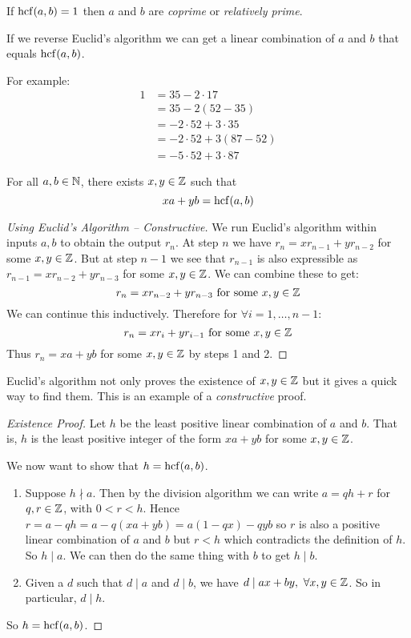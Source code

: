 \documentclass[../main.tex]{subfiles}
\begin{document}
\begin{definition}[Coprime]
  If $\operatorname{hcf}(a, b) = 1$ then $a$ and $b$ are \textit{coprime} or \textit{relatively prime}.
\end{definition}
If we reverse Euclid's algorithm we can get a linear combination of $a$ and $b$ that equals $\operatorname{hcf}(a, b)$.
\begin{example}
  For example:
  \begin{align*}
    1 &= 35 - 2 \cdot 17 \\
      &= 35 - 2(52 - 35) \\
      &= -2 \cdot 52 + 3 \cdot 35 \\
      &= -2 \cdot 52 + 3(87 - 52) \\
      &= -5 \cdot 52 + 3 \cdot 87
  \end{align*}
\end{example}
\begin{theorem}
  For all $a, b \in \mathbb{N}$, there exists $x, y \in \mathbb{Z}$ such that
  \[
    xa + yb = \operatorname{hcf}(a, b)
    \label{bezoutsIdentity}
  \]
\end{theorem}
\begin{proof}[Using Euclid's Algorithm -- Constructive]
  We run Euclid's algorithm within inputs $a, b$ to obtain the output $r_n$.
  At step $n$ we have $r_n = xr_{n-1} + yr_{n-2}$ for some $x, y \in \mathbb{Z}$.
  But at step $n-1$ we see that $r_{n-1}$ is also expressible as $r_{n-1} = xr_{n-2} + yr_{n-3}$ for some $x, y \in \mathbb{Z}$.
  We can combine these to get:
  \[
    r_{n} = xr_{n-2} + yr_{n-3} \text{ for some }x, y \in \mathbb{Z}
  \]
  We can continue this inductively.
  Therefore for $\forall i = 1, \ldots, n-1$:
  \[
    r_n = xr_i + yr_{i-1} \text{ for some }x, y \in \mathbb{Z}
  \]
  Thus $r_n = xa + yb$ for some $x, y \in \mathbb{Z}$ by steps 1 and 2.
\end{proof}
\begin{remark}
  Euclid's algorithm not only proves the existence of $x, y \in \mathbb{Z}$ but it gives a quick way to find them.
  This is an example of a \textit{constructive} proof.
\end{remark}
\begin{proof}[Existence Proof]
  Let $h$ be the least positive linear combination of $a$ and $b$.
  That is, $h$ is the least positive integer of the form $xa + yb$ for some $x, y \in \mathbb{Z}$.

  We now want to show that $h = \operatorname{hcf}(a, b)$.
  \begin{enumerate}
    \item Suppose $h \nmid a$. Then by the division algorithm we can write $a = qh + r$ for $q, r \in \mathbb{Z}$, with $0 < r < h$.
      Hence $r = a - qh = a - q(xa + yb) = a(1-qx) - qyb$ so $r$ is also a positive linear combination of $a$ and $b$ but $r < h$ which contradicts the definition of $h$.
      So $h \mid a$.
      We can then do the same thing with $b$ to get $h \mid b$.
    \item Given a $d$ such that $d \mid a$ and $d \mid b$, we have $d \mid ax + by,\ \forall x, y \in \mathbb{Z}$.
      So in particular, $d \mid h$.
  \end{enumerate}
  So $h = \operatorname{hcf}(a, b)$.
\end{proof}
\end{document}
